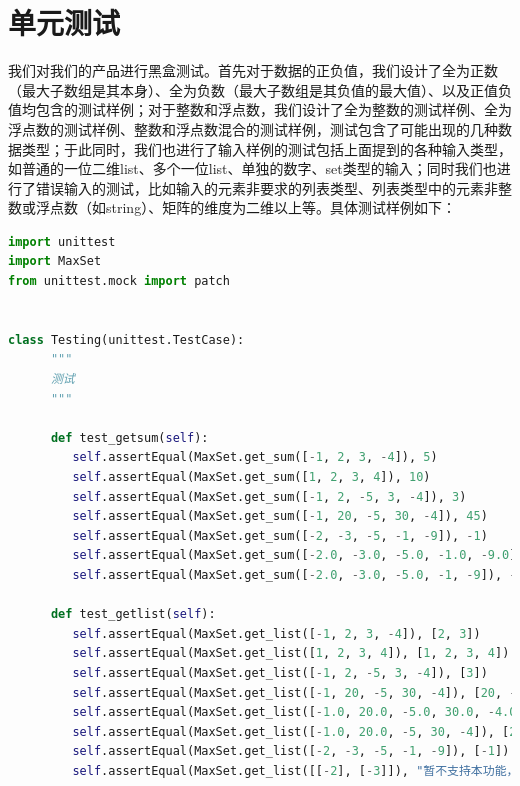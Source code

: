 \documentclass{article}
\begin{document}
\section{单元测试}
我们对我们的产品进行黑盒测试。首先对于数据的正负值，我们设计了全为正数（最大子数组是其本身）、全为负数（最大子数组是其负值的最大值）、以及正值负值均包含的测试样例；对于整数和浮点数，我们设计了全为整数的测试样例、全为浮点数的测试样例、整数和浮点数混合的测试样例，测试包含了可能出现的几种数据类型；于此同时，我们也进行了输入样例的测试包括上面提到的各种输入类型，如普通的一位二维list、多个一位list、单独的数字、set类型的输入；同时我们也进行了错误输入的测试，比如输入的元素非要求的列表类型、列表类型中的元素非整数或浮点数（如string）、矩阵的维度为二维以上等。具体测试样例如下：
\begin{lstlisting}[language = python]
import unittest
import MaxSet
from unittest.mock import patch


class Testing(unittest.TestCase):
      """
      测试
      """

      def test_getsum(self):
         self.assertEqual(MaxSet.get_sum([-1, 2, 3, -4]), 5)
         self.assertEqual(MaxSet.get_sum([1, 2, 3, 4]), 10)
         self.assertEqual(MaxSet.get_sum([-1, 2, -5, 3, -4]), 3)
         self.assertEqual(MaxSet.get_sum([-1, 20, -5, 30, -4]), 45)
         self.assertEqual(MaxSet.get_sum([-2, -3, -5, -1, -9]), -1)
         self.assertEqual(MaxSet.get_sum([-2.0, -3.0, -5.0, -1.0, -9.0]), -1)
         self.assertEqual(MaxSet.get_sum([-2.0, -3.0, -5.0, -1, -9]), -1)

      def test_getlist(self):
         self.assertEqual(MaxSet.get_list([-1, 2, 3, -4]), [2, 3])
         self.assertEqual(MaxSet.get_list([1, 2, 3, 4]), [1, 2, 3, 4])
         self.assertEqual(MaxSet.get_list([-1, 2, -5, 3, -4]), [3])
         self.assertEqual(MaxSet.get_list([-1, 20, -5, 30, -4]), [20, -5, 30])
         self.assertEqual(MaxSet.get_list([-1.0, 20.0, -5.0, 30.0, -4.0]), [20.0, -5.0, 30.0])
         self.assertEqual(MaxSet.get_list([-1.0, 20.0, -5, 30, -4]), [20.0, -5, 30])
         self.assertEqual(MaxSet.get_list([-2, -3, -5, -1, -9]), [-1])
         self.assertEqual(MaxSet.get_list([[-2], [-3]]), "暂不支持本功能，敬请期待！")


\end{lstlisting}
\end{document}
